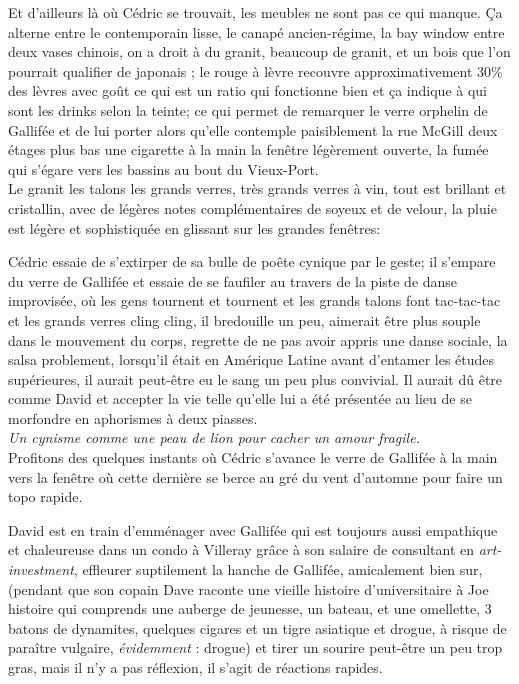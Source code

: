 \documentclass{article}
\begin{document}
Et d'ailleurs là où Cédric se trouvait, les meubles ne sont pas ce qui manque.
Ça alterne entre le contemporain lisse, le canapé ancien-régime, la bay window
entre deux vases chinois, on a droit à du granit, beaucoup de granit, et un bois
que l'on pourrait qualifier de japonais ; le rouge à lèvre recouvre
approximativement 30\% des lèvres avec goût ce qui est un ratio qui fonctionne
bien et ça indique à qui sont les drinks selon la teinte; ce qui permet de
remarquer le verre orphelin de Gallifée et de lui porter alors qu'elle contemple
paisiblement la rue McGill deux étages plus bas une cigarette à la main la
fenêtre légèrement ouverte, la fumée qui s'égare vers les bassins au bout du
Vieux-Port. \\

Le granit les talons les grands verres, très grands verres à vin, tout est
brillant et cristallin, avec de légères notes complémentaires de soyeux et de
velour, la pluie est légère et sophistiquée en glissant sur les grandes
fenêtres:

Cédric essaie
de s'extirper de sa bulle de poête cynique par le geste; il s'empare du
verre de Gallifée et essaie de se faufiler au travers de la piste de danse
improvisée, où les gens tournent et tournent et les grands talons font
tac-tac-tac et les grands verres cling cling, il bredouille un peu, aimerait
être plus souple dans le mouvement du corps, regrette de ne pas avoir appris
une danse sociale, la salsa problement, lorsqu'il était en Amérique Latine
avant d'entamer les études supérieures, il aurait peut-être eu le sang un
peu plus convivial. Il aurait dû être comme David et accepter la vie telle
qu'elle lui a été présentée au lieu de se morfondre en aphorismes à deux
piasses.\\

\emph{Un cynisme comme une peau de lion pour cacher un amour fragile.}\\

Profitons des quelques instants où Cédric s'avance le verre de Gallifée à la
main vers la fenêtre où cette dernière se berce au gré du vent d'automne pour
faire un topo rapide.

David est en train d'emménager avec Gallifée qui est toujours aussi
empathique et chaleureuse dans un condo à Villeray grâce à son salaire de
consultant en \textit{art-investment}, effleurer suptilement la hanche de
Gallifée, amicalement bien sur, (pendant que son copain Dave raconte une
vieille histoire d'universitaire à Joe histoire qui comprends une auberge de
jeunesse, un bateau, et une omellette, 3 batons de dynamites, quelques
cigares et un tigre asiatique et drogue, à risque de paraître vulgaire,
\emph{évidemment} : drogue) et tirer un sourire peut-être un peu trop gras,
mais il n'y a pas réflexion, il s'agit de réactions rapides. \\
\end{document}
